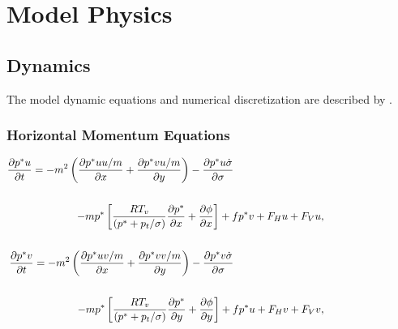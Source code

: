 
\newpage

\chapter{Model Physics}

\section{Dynamics}
The model dynamic equations and numerical discretization are described by
\cite{Grell_94}.

\subsection{Horizontal Momentum Equations}

\begin{eqnarray} \nonumber
{\partial{p^{\ast}u} \over \partial{t}} = -m^2 \left( {\partial{p^{\ast}uu/m}
\over \partial{x}} + {\partial{p^{\ast}vu/m} \over \partial{y}} \right) -
{\partial{p^{\ast}u \dot{\sigma}} \over \partial{\sigma}}  \hspace{6cm} \\
\nonumber \\ 
- m p^{\ast} \left[ {RT_v \over ({p^{\ast} + p_t/\sigma)}} {\partial{p^{\ast}}
  \over \partial{x}} + {\partial{\phi} \over \partial{x}} \right] + fp^{\ast}v +
F_Hu + F_Vu, \hspace{3cm} \\\nonumber \\ \nonumber {\partial{p^{\ast}v} \over
\partial{t}} = -m^2 \left( {\partial{p^{\ast}uv/m} \over \partial{x}} +
{\partial{p^{\ast}vv/m} \over \partial{y}} \right) - {\partial{p^{\ast}v
\dot{\sigma}} \over \partial{\sigma}}  \hspace{6cm} \\ \nonumber \\
- m p^{\ast} \left[ {RT_v \over ({p^{\ast} + p_t/\sigma)}} {\partial{p^{\ast}}
  \over \partial{y}} + {\partial{\phi} \over \partial{y}} \right] + fp^{\ast}u +
F_Hv + F_Vv, \hspace{3cm} \\ \nonumber
\end{eqnarray}

